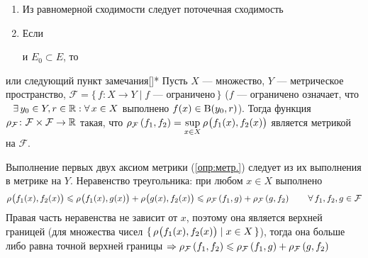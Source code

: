 \begin{zam}[https://www.youtube.com/live/oGN0SkfpZME?si=Xt7wgIwZyTC3gAy9&t=10296] %
	\begin{enumerate}
		\item Из равномерной сходимости следует поточечная сходимость 
		
		\item Если  и $E_0 \subset E$, то 
	\end{enumerate}
\end{zam} %

\begin{lem}[https://www.youtube.com/live/oGN0SkfpZME?si=v9AomZJHSzhlMvMm&t=10556]{или следующий пункт замечания}[]*\label{метр.для отобр.}
	Пусть $X$ --- множество, $Y$ --- метрическое пространство,\quad 
	$\mathcal F = \{\, f \colon X \to Y \mid f\text{ --- ограничено}\,\}$ \linebreak 
	({\small$f$ --- ограничено означает, что$\E y_0 \in Y, r \in \rr : \A x \in X$ выполнено $f(x) \in \B{y_0, r}$}). 
	Тогда функция $\rho_{\mathcal F} \colon \mathcal{F} \times \mathcal{F} \to \rr$ такая, что 
	$\metr[\mathcal F]{f_1, f_2} = \sup\limits_{x \in X} \bmetr{f_1(x), f_2(x)}$ 
	является метрикой на $\mathcal F$.
\end{lem} %
	
\begin{prf} %
	Выполнение \smallskip первых двух аксиом метрики (\ref{опр:метр.}) следует из их выполнения в метрике на $Y$. Неравенство треугольника: при любом $x \in X$ выполнено
	\[\bmetr{f_1(x), f_2(x)} \< \bmetr{f_1(x), g(x)} + \bmetr{g(x), f_2(x)} \< \metr[\mathcal F]{f_1, g} + \metr[\mathcal F]{g, f_2} \qquad \A f_1, f_2, g \in \mathcal F\]
	Правая часть неравенства не зависит от $x$, поэтому она является верхней границей (для множества чисел $\{\,\bmetr{f_1(x), f_2(x)} \mid x \in X\,\}$), тогда она больше \smallskip либо равна точной верхней границы  $\Rightarrow \metr[\mathcal F]{f_1, f_2} \< \metr[\mathcal F]{f_1, g} + \metr[\mathcal F]{g, f_2}$
\end{prf} %


